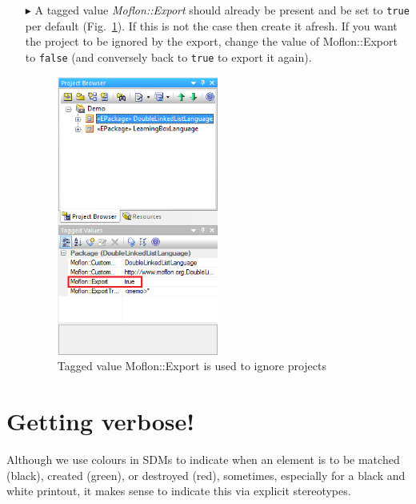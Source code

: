\begin{enumerate}
\item[$\blacktriangleright$] A tagged value \emph{Moflon::Export} should already be present and be set to \texttt{true} per default (Fig.~\ref{fig_ignoreExportingProject02}). 
If this is not the case then create it afresh.
If you want the project to be ignored by the export, change the value of Moflon::Export to \texttt{false} (and conversely back to \texttt{true} to export it again).
\begin{figure}[htbp]
\begin{center}
\includegraphics[width=0.5\textwidth]{pics/tricks/ignoreExportingProject/ignoreExportingProject2}
  \caption{Tagged value Moflon::Export is used to ignore projects}  
  \label{fig_ignoreExportingProject02}
\end{center}
\end{figure}
\end{enumerate}


\section{Getting verbose!}
Although we use colours in SDMs to indicate when an element is to be matched (black), created (green), or destroyed (red), sometimes, especially for a black and white printout, it makes sense to indicate this via explicit stereotypes.

